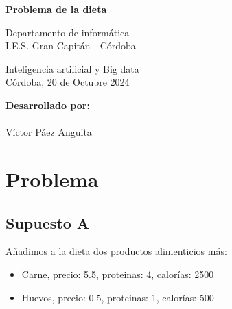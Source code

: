 \documentclass[12pt]{article}
\begin{document}
\begin{titlepage}
    \begin{center}
      \Large \bfseries{}
    \end{center}
    \vspace{0.8cm}
    \begin{center}
      \Large \bfseries{}
    \end{center}
    \vspace{0.8cm}
    \begin{center}
     \Large \bfseries{Problema de la dieta}
    \end{center}
    \vspace{0.0001cm}
    \begin{center}
        Departamento de informática \\ I.E.S. Gran Capitán - Córdoba
    \end{center}
        \vspace{2 cm}
    \vspace{0.2 cm}
    \begin{center}
        Inteligencia artificial y Big data \\ Córdoba, 20 de Octubre 2024
    \end{center}
    \vspace{10 cm}
\null\hfill \textbf{Desarrollado por:}
\\
\\
\null\hfill Víctor Páez Anguita
\clearpage
\end{titlepage}

\tableofcontents
\clearpage

\section{Problema}

\subsection{Supuesto A}

Añadimos a la dieta dos productos alimenticios más: 

\begin{itemize}
    \item Carne, precio: 5.5, proteinas: 4, calorías: 2500
    \item Huevos, precio: 0.5, proteinas: 1, calorías: 500
\end{itemize}
\end{document}
